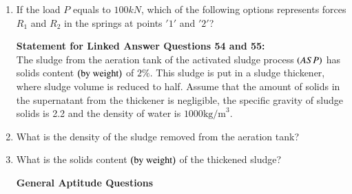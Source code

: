 \documentclass[journal]{IEEEtran}
\begin{document}
\begin{enumerate}[start=53]
\item If the load $P$ equals to $100kN$, which of the following options represents forces $R_1$ and $R_2$ in the springs at points $'1'$ and $'2'$?
\begin{enumerate}
\end{enumerate}

\textbf{Statement for Linked Answer Questions 54 and 55:}\\
The sludge from the aeration tank of the activated sludge process $\left(ASP\right)$ has solids content $\left(\text{by weight}\right)$ of $2\%$. This sludge is put in a sludge thickener, where sludge volume is reduced to half. Assume that the amount of solids in the supernatant from the thickener is negligible, the specific gravity of sludge solids is 2.2 and the density of water is $1000\text{kg/m}^3$.\\
\item What is the density of the sludge removed from the aeration tank?
\begin{enumerate}
\end{enumerate}
\item What is the solids content $\left(\text{by weight}\right)$ of the thickened sludge?
\begin{enumerate}
\end{enumerate}
\textbf{General Aptitude  Questions}\\

\end{enumerate}
\end{document}
